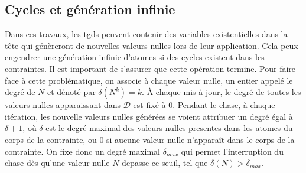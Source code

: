 \subsection{Cycles et génération infinie}
\label{sec:update:chase:infini}
Dans ces travaux, les \glspl{tgd} peuvent contenir des variables existentielles dans la tête qui génèreront de nouvelles valeurs nulles lors de leur application.
Cela peux engendrer une génération infinie d'atomes si des cycles existent dans les contraintes.
Il est important de s'assurer que cette opération termine.
Pour faire face à cette problématique, on associe à chaque valeur nulle, un entier appelé le degré de $N$ et dénoté par $\delta(N^k) = k$.
À chaque mis à jour, le degré de toutes les valeurs nulles apparaissant dans $\mathcal{D}$ est fixé à $0$.
Pendant le \gls{chase}, à chaque itération, les nouvelle valeurs nulles générées se voient attribuer un degré égal à $\delta + 1$, où $\delta$ est le degré maximal des valeurs nulles presentes dans les atomes du corps de la contrainte, ou $0$ si aucune valeur nulle n'apparaît dans le corps de la contrainte.
On fixe donc un degré maximal $\delta_{max}$ qui permet l'interruption du \gls{chase} dès qu'une valeur nulle $N$ depasse ce seuil, tel que $\delta(N) > \delta_{max}$.

